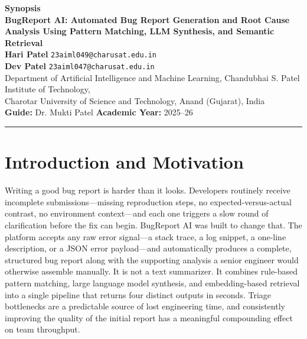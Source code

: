 \documentclass[12pt,a4paper]{article}
\begin{document}
\begin{center}
  {\Large \textbf{Synopsis}}\\[0.5em]
  {\large \textbf{BugReport AI: Automated Bug Report Generation and Root Cause Analysis
  Using Pattern Matching, LLM Synthesis, and Semantic Retrieval}}\\[0.7em]
  \normalsize
  \textbf{Hari Patel} \quad \texttt{23aiml049@charusat.edu.in}\\[0.2em]
  \textbf{Dev Patel} \quad \texttt{23aiml047@charusat.edu.in}\\[0.3em]
  \small
  Department of Artificial Intelligence and Machine Learning,
  Chandubhai S. Patel Institute of Technology,\\
  Charotar University of Science and Technology, Anand (Gujarat), India\\[0.3em]
  \normalsize
  \textbf{Guide:} Dr. Mukti Patel \qquad \textbf{Academic Year:} 2025--26
\end{center}

\vspace{0.3em}
\hrule
\vspace{0.6em}

\section{Introduction and Motivation}

Writing a good bug report is harder than it looks. Developers routinely receive incomplete submissions---missing reproduction steps, no expected-versus-actual contrast, no environment context---and each one triggers a slow round of clarification before the fix can begin. BugReport AI was built to change that. The platform accepts any raw error signal---a stack trace, a log snippet, a one-line description, or a JSON error payload---and automatically produces a complete, structured bug report along with the supporting analysis a senior engineer would otherwise assemble manually. It is not a text summarizer. It combines rule-based pattern matching, large language model synthesis, and embedding-based retrieval into a single pipeline that returns four distinct outputs in seconds. Triage bottlenecks are a predictable source of lost engineering time, and consistently improving the quality of the initial report has a meaningful compounding effect on team throughput.
\end{document}
